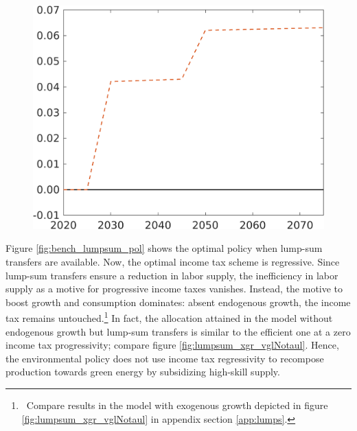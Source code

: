 \begin{figure}[h!!]
\begin{minipage}[]{0.32\textwidth}
	\end{minipage}
	\begin{minipage}[]{0.32\textwidth}
		\includegraphics[width=1\textwidth]{../../codding_model/own_basedOnFried/optimalPol_190722_tidiedUp/figures/all_July22/comp_bb3_notaul4_OPT_T_NoTaus_Tls_spillover0_noskill0_sep1_xgrowth0_etaa0.79_lgd0.png}
	\end{minipage}
\end{figure}


Figure \ref{fig:bench_lumpsum_pol} shows the optimal policy when lump-sum transfers are available. 
Now, the optimal income tax scheme is regressive. Since lump-sum transfers ensure a reduction in labor supply, the inefficiency in labor supply as a motive for progressive income taxes vanishes.
Instead, the motive to boost growth and consumption dominates: absent endogenous growth, the income tax remains untouched.\footnote{\ Compare results in the model with exogenous growth depicted in figure \ref{fig:lumpsum_xgr_vglNotaul} in appendix section \ref{app:lumps}.}  In fact, the allocation attained in the model without endogenous growth but lump-sum transfers is similar to the efficient one at a zero income tax progressivity; compare figure \ref{fig:lumpsum_xgr_vglNotaul}. Hence, the environmental policy does not use income tax regressivity to recompose production towards green energy by subsidizing high-skill supply.
 
